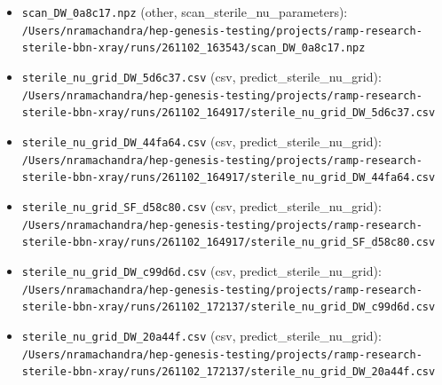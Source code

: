 \documentclass[11pt,a4paper]{article}
\begin{document}
\begin{itemize}
  \item \texttt{scan\_\allowbreak{}DW\_\allowbreak{}0a8c17.npz} (other, scan\_sterile\_nu\_parameters): \texttt{/\allowbreak{}Users/\allowbreak{}nramachandra/\allowbreak{}hep-genesis-testing/\allowbreak{}projects/\allowbreak{}ramp-research-sterile-bbn-xray/\allowbreak{}runs/\allowbreak{}261102\_\allowbreak{}163543/\allowbreak{}scan\_\allowbreak{}DW\_\allowbreak{}0a8c17.npz}
  \item \texttt{sterile\_\allowbreak{}nu\_\allowbreak{}grid\_\allowbreak{}DW\_\allowbreak{}5d6c37.csv} (csv, predict\_sterile\_nu\_grid): \texttt{/\allowbreak{}Users/\allowbreak{}nramachandra/\allowbreak{}hep-genesis-testing/\allowbreak{}projects/\allowbreak{}ramp-research-sterile-bbn-xray/\allowbreak{}runs/\allowbreak{}261102\_\allowbreak{}164917/\allowbreak{}sterile\_\allowbreak{}nu\_\allowbreak{}grid\_\allowbreak{}DW\_\allowbreak{}5d6c37.csv}
  \item \texttt{sterile\_\allowbreak{}nu\_\allowbreak{}grid\_\allowbreak{}DW\_\allowbreak{}44fa64.csv} (csv, predict\_sterile\_nu\_grid): \texttt{/\allowbreak{}Users/\allowbreak{}nramachandra/\allowbreak{}hep-genesis-testing/\allowbreak{}projects/\allowbreak{}ramp-research-sterile-bbn-xray/\allowbreak{}runs/\allowbreak{}261102\_\allowbreak{}164917/\allowbreak{}sterile\_\allowbreak{}nu\_\allowbreak{}grid\_\allowbreak{}DW\_\allowbreak{}44fa64.csv}
  \item \texttt{sterile\_\allowbreak{}nu\_\allowbreak{}grid\_\allowbreak{}SF\_\allowbreak{}d58c80.csv} (csv, predict\_sterile\_nu\_grid): \texttt{/\allowbreak{}Users/\allowbreak{}nramachandra/\allowbreak{}hep-genesis-testing/\allowbreak{}projects/\allowbreak{}ramp-research-sterile-bbn-xray/\allowbreak{}runs/\allowbreak{}261102\_\allowbreak{}164917/\allowbreak{}sterile\_\allowbreak{}nu\_\allowbreak{}grid\_\allowbreak{}SF\_\allowbreak{}d58c80.csv}
  \item \texttt{sterile\_\allowbreak{}nu\_\allowbreak{}grid\_\allowbreak{}DW\_\allowbreak{}c99d6d.csv} (csv, predict\_sterile\_nu\_grid): \texttt{/\allowbreak{}Users/\allowbreak{}nramachandra/\allowbreak{}hep-genesis-testing/\allowbreak{}projects/\allowbreak{}ramp-research-sterile-bbn-xray/\allowbreak{}runs/\allowbreak{}261102\_\allowbreak{}172137/\allowbreak{}sterile\_\allowbreak{}nu\_\allowbreak{}grid\_\allowbreak{}DW\_\allowbreak{}c99d6d.csv}
  \item \texttt{sterile\_\allowbreak{}nu\_\allowbreak{}grid\_\allowbreak{}DW\_\allowbreak{}20a44f.csv} (csv, predict\_sterile\_nu\_grid): \texttt{/\allowbreak{}Users/\allowbreak{}nramachandra/\allowbreak{}hep-genesis-testing/\allowbreak{}projects/\allowbreak{}ramp-research-sterile-bbn-xray/\allowbreak{}runs/\allowbreak{}261102\_\allowbreak{}172137/\allowbreak{}sterile\_\allowbreak{}nu\_\allowbreak{}grid\_\allowbreak{}DW\_\allowbreak{}20a44f.csv}

\end{itemize}
\end{document}
